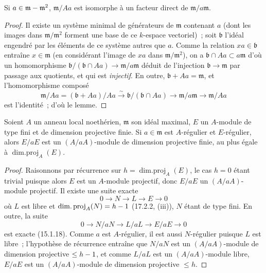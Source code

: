 \begin{lemma}[17.3.1.3]
\label{0.17.3.1.3-fr}
Si $a\in\mathfrak{m}-\mathfrak{m}^2$, $\mathfrak{m}/Aa$ est isomorphe à un
facteur direct de $\mathfrak{m}/a\mathfrak{m}$.
\end{lemma}

\begin{proof}
Il existe un système minimal de générateurs de $\mathfrak{m}$ contenant $a$
(dont les images dans $\mathfrak{m}/\mathfrak{m}^2$ forment une base de ce
$k$-espace vectoriel)~; soit $\mathfrak{b}$ l'idéal engendré par les éléments
de ce système autres que $a$. Comme la relation $xa\in\mathfrak{b}$ entraîne
$x\in\mathfrak{m}$ (en considérant l'image de $xa$ dans
$\mathfrak{m}/\mathfrak{m}^2$), on a
$\mathfrak{b}\cap Aa\subset a\mathfrak{m}$ d'où un homomorphisme
$\mathfrak{b}/(\mathfrak{b}\cap Aa)\longrightarrow
\mathfrak{m}/a\mathfrak{m}$ déduit de l'injection
$\mathfrak{b}\longrightarrow\mathfrak{m}$ par passage aux quotients, et qui
est \emph{injectif}. En outre, $\mathfrak{b}+Aa=\mathfrak{m}$, et
l'homomorphisme composé
\[
  \mathfrak{m}/Aa=(\mathfrak{b}+Aa)/Aa
  \xrightarrow{\sim}\mathfrak{b}/(\mathfrak{b}\cap Aa)
  \longrightarrow\mathfrak{m}/a\mathfrak{m}
  \longrightarrow\mathfrak{m}/Aa
\]
est l'identité~; d'où le lemme.
\end{proof}

\begin{lemma}[17.3.1.4]
\label{0.17.3.1.4-fr}
Soient $A$ un anneau local noethérien, $\mathfrak{m}$ son idéal maximal, $E$
un $A$-module de type fini et de dimension projective finie. Si
$a\in\mathfrak{m}$ est $A$-régulier et $E$-régulier, alors $E/aE$ est un
$(A/aA)$-module de dimension projective finie, au plus égale à
$\operatorname{dim.proj}_A(E)$.
\end{lemma}

\begin{proof}
Raisonnons par récurrence sur $h=\operatorname{dim.proj}_A(E)$, le cas $h=0$
étant trivial puisque alors $E$ est un $A$-module projectif, donc $E/aE$ un
$(A/aA)$-module projectif. Il existe une suite exacte
\[
  0\longrightarrow N\longrightarrow L\longrightarrow E\longrightarrow0
\]
où $L$ est libre et $\operatorname{dim.proj}_A(N)=h- 1$ (17.2.2, (iii)), $N$
étant de type fini. En outre, la suite
\[
  0\longrightarrow N/aN\longrightarrow L/aL\longrightarrow E/aE
  \longrightarrow0
\]
est exacte (15.1.18). Comme $a$ est $A$-régulier, il est aussi $N$-régulier
puisque $L$ est libre~; l'hypothèse de récurrence entraîne que $N/aN$ est un
$(A/aA)$-module de dimension projective $\leq h- 1$, et comme $L/aL$ est un
$(A/aA)$-module libre, $E/aE$ est un $(A/aA)$-module de dimension projective
$\leq h$.
\end{proof}

